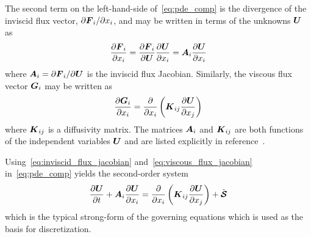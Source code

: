 The second term on the left-hand-side of~\eqref{eq:pde_comp} is the divergence of the inviscid flux vector, $\partial{\boldsymbol{F}}_i/\partial x_i$, and may be written in terms of the unknowns ${\boldsymbol{U}}$ as
\begin{equation}
  \label{eq:inviscid_flux_jacobian}
  {\frac{\partial{{\boldsymbol{F}}_i}}{\partial{x_i}}} =
    {\frac{\partial{{\boldsymbol{F}}_i}}{\partial{{\boldsymbol{U}}}}} {\frac{\partial{{\boldsymbol{U}}}}{\partial{x_i}}} =
      {\boldsymbol{A}}_i {\frac{\partial{{\boldsymbol{U}}}}{\partial{x_i}}}
\end{equation}
where ${\boldsymbol{A}}_i = \partial {\boldsymbol{F}}_i/ \partial {\boldsymbol{U}}$ is the inviscid flux Jacobian. Similarly, the viscous flux vector ${\boldsymbol{G}}_i$ may be written as
\begin{equation}
  \label{eq:viscous_flux_jacobian}
  {\frac{\partial{{\boldsymbol{G}}_i}}{\partial{x_i}}} = {\frac{\partial{}}{\partial{x_i}}} \left( {\boldsymbol{K}}_{ij} {\frac{\partial{{\boldsymbol{U}}}}{\partial{x_j}}} \right)
\end{equation}
where ${\boldsymbol{K}}_{ij}$ is a diffusivity matrix. The matrices ${\boldsymbol{A}}_i$ and ${\boldsymbol{K}}_{ij}$ are both functions of the independent variables ${\boldsymbol{U}}$ and are listed explicitly in reference~.

Using~\eqref{eq:inviscid_flux_jacobian} and~\eqref{eq:viscous_flux_jacobian} in~\eqref{eq:pde_comp} yields the second-order system
\begin{equation}
  {\frac{\partial{{\boldsymbol{U}}}}{\partial{t}}} + {\boldsymbol{A}}_i {\frac{\partial{{\boldsymbol{U}}}}{\partial{x_i}}} =
    {\frac{\partial{}}{\partial{x_i}}} \left( {\boldsymbol{K}}_{ij} {\frac{\partial{{\boldsymbol{U}}}}{\partial{x_j}}} \right) + \dot{{\boldsymbol{\mathcal{S}}}}
\end{equation}
which is the typical strong-form of the governing equations which is used as the basis for discretization. 

